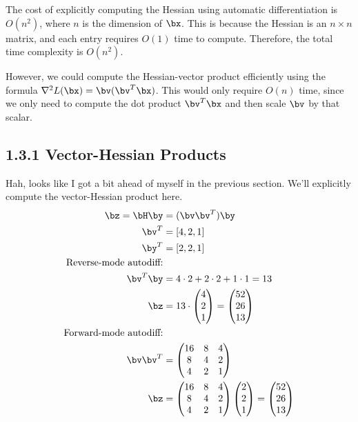 \documentclass[12pt]{article}
\begin{document}
The cost of explicitly computing the Hessian using automatic differentiation is $O(n^2)$, where $n$ is the
dimension of $\bx$. This is because the Hessian is an $n \times n$ matrix, and each entry
requires $O(1)$ time to compute. Therefore, the total time complexity is $O(n^2)$.

However, we could compute the Hessian-vector product
efficiently using the formula $\nabla^2 L(\bx) = \bv(\bv^T\bx)$. This would only require
$O(n)$ time, since we only need to compute the dot product $\bv^T\bx$ and then scale $\bv$ by that
scalar.

\subsection*{1.3.1 Vector-Hessian Products}
Hah, looks like I got a bit ahead of myself in the previous section. We'll explicitly compute the
vector-Hessian product here.
\begin{align*}
		\bz = \bH \by &= (\bv\bv^T)\by \\
		\bv^T &= [4,2,1] \\
		\by^T &= [2,2,1] \\
		\text{Reverse-mode autodiff:} \\
		\bv^T\by &= 4\cdot 2 + 2\cdot 2 + 1\cdot 1 = 13 \\
		\bz &= 13 \cdot
		\begin{pmatrix}
				4 \\
				2 \\
				1
		\end{pmatrix} =
		\begin{pmatrix}
				52 \\
				26 \\
				13
		\end{pmatrix} \\
		\text{Forward-mode autodiff:} \\
		\bv\bv^T &=
		\begin{pmatrix}
				16 & 8 & 4 \\
				8 & 4 & 2 \\
				4 & 2 & 1
		\end{pmatrix} \\
		\bz &=
		\begin{pmatrix}
				16 & 8 & 4 \\
				8 & 4 & 2 \\
				4 & 2 & 1
		\end{pmatrix}
		\begin{pmatrix}
				2 \\
				2 \\
				1
		\end{pmatrix} =
		\begin{pmatrix}
				52 \\
				26 \\
				13
		\end{pmatrix}
\end{align*}
\end{document}
